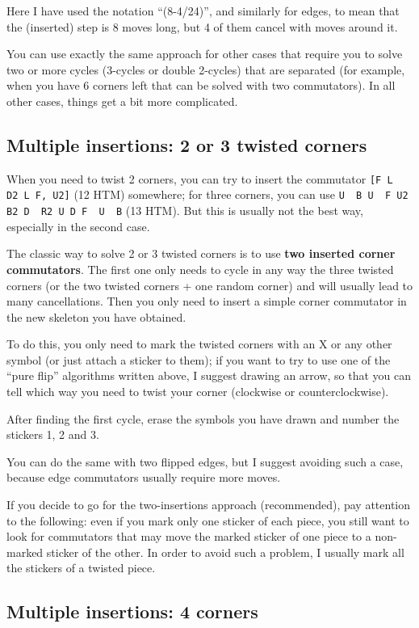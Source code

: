 \documentclass[11pt,a4paper]{book}
\newcommand{\p}{\textquotesingle}
\newcommand{\m}{\texttt}
\newcommand{\ps}{\p\,\,}
\begin{document}
Here I have used the notation ``(8-4/24)'', and similarly for edges, to mean that the (inserted) step is 8 moves long, but 4 of them cancel with moves around it.

You can use exactly the same approach for other cases that require you to solve two or more cycles (3-cycles or double 2-cycles) that are separated (for example, when you have 6 corners left that can be solved with two commutators). In all other cases, things get a bit more complicated.

\subsection{Multiple insertions: 2 or 3 twisted corners}

When you need to twist 2 corners, you can try to insert the commutator \m{[F L\ps D2 L F\p, U2]} (12 HTM) somewhere; for three corners, you can use \m{U\ps B U\ps F U2 B2 D\ps R2 U D F\ps U\ps B} (13 HTM). But this is usually not the best way, especially in the second case.

The classic way to solve 2 or 3 twisted corners is to use \textbf{two inserted corner commutators}. The first one only needs to cycle in any way the three twisted corners (or the two twisted corners + one random corner) and will usually lead to many cancellations. Then you only need to insert a simple corner commutator in the new skeleton you have obtained.

To do this, you only need to mark the twisted corners with an X or any other symbol (or just attach a sticker to them); if you want to try to use one of the “pure flip” algorithms written above, I suggest drawing an arrow, so that you can tell which way you need to twist your corner (clockwise or counterclockwise).

After finding the first cycle, erase the symbols you have drawn and number the stickers 1, 2 and 3.

You can do the same with two flipped edges, but I suggest avoiding such a case, because edge commutators usually require more moves.

If you decide to go for the two-insertions approach (recommended), pay attention to the following: even if you mark only one sticker of each piece, you still want to look for commutators that may move the marked sticker of one piece to a non-marked sticker of the other. In order to avoid such a problem, I usually mark all the stickers of a twisted piece.

\subsection{Multiple insertions: 4 corners}
\end{document}
